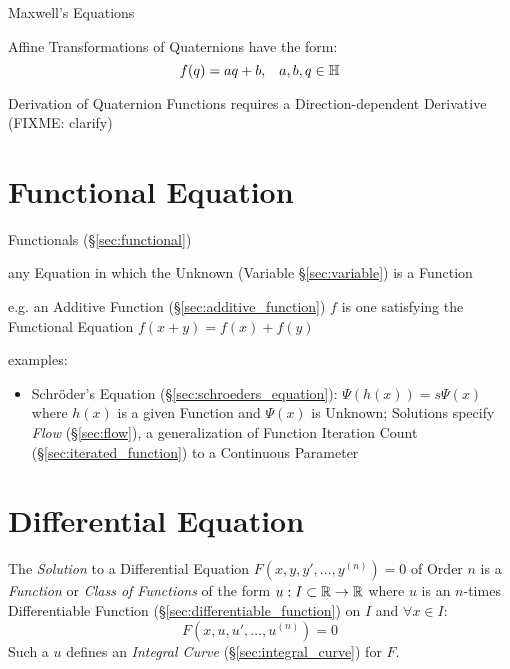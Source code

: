 Maxwell's Equations

Affine Transformations of Quaternions have the form:
\[
  f(q) = aq + b, \;\;\; a,b,q \in \mathbb{H}
\]

Derivation of Quaternion Functions requires a Direction-dependent Derivative
(FIXME: clarify)



\section{Functional Equation}\label{sec:functional_equation}


Functionals (\S\ref{sec:functional})

any Equation in which the Unknown (Variable \S\ref{sec:variable}) is a Function

e.g. an Additive Function (\S\ref{sec:additive_function}) $f$ is one satisfying
the Functional Equation $f(x + y) = f(x) + f(y)$


examples:
\begin{itemize}
  \item Schr\"oder's Equation (\S\ref{sec:schroeders_equation}): $\Psi(h(x)) =
    s\Psi(x)$ where $h(x)$ is a given Function and $\Psi(x)$ is Unknown;
    Solutions specify \emph{Flow} (\S\ref{sec:flow}), a generalization of
    Function Iteration Count (\S\ref{sec:iterated_function}) to a Continuous
    Parameter
\end{itemize}



\section{Differential Equation}\label{sec:differential_equation}

The \emph{Solution} to a Differential Equation $F(x,y,y',\ldots,y^{(n)}) = 0$
of Order $n$ is a \emph{Function} or \emph{Class of Functions} of the form $u :
I \subset \mathbb{R} \rightarrow \mathbb{R}$ where $u$ is an $n$-times Differentiable
Function (\S\ref{sec:differentiable_function}) on $I$ and $\forall x \in I$:
\[
  F(x,u,u',\ldots,u^{(n)}) = 0
\]
Such a $u$ defines an \emph{Integral Curve} (\S\ref{sec:integral_curve}) for
$F$.

